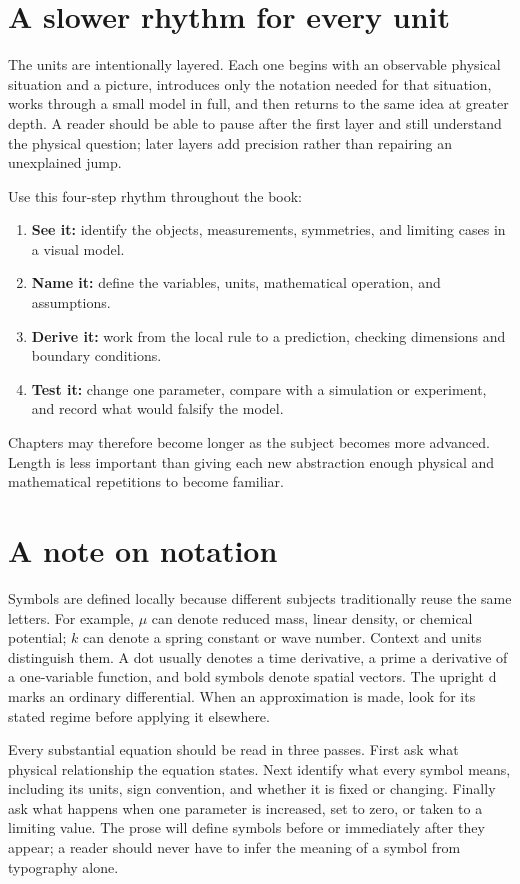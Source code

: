 \documentclass[11pt,oneside]{book}
\newcommand{\dd}{\mathrm{d}}
\theoremstyle{reviewstyle}
\begin{document}
\section*{A slower rhythm for every unit}
The units are intentionally layered. Each one begins with an observable physical situation and a picture, introduces only the notation needed for that situation, works through a small model in full, and then returns to the same idea at greater depth. A reader should be able to pause after the first layer and still understand the physical question; later layers add precision rather than repairing an unexplained jump.

Use this four-step rhythm throughout the book:
\begin{enumerate}
\item \textbf{See it:} identify the objects, measurements, symmetries, and limiting cases in a visual model.
\item \textbf{Name it:} define the variables, units, mathematical operation, and assumptions.
\item \textbf{Derive it:} work from the local rule to a prediction, checking dimensions and boundary conditions.
\item \textbf{Test it:} change one parameter, compare with a simulation or experiment, and record what would falsify the model.
\end{enumerate}
Chapters may therefore become longer as the subject becomes more advanced. Length is less important than giving each new abstraction enough physical and mathematical repetitions to become familiar.

\section*{A note on notation}
Symbols are defined locally because different subjects traditionally reuse the same letters. For example, $\mu$ can denote reduced mass, linear density, or chemical potential; $k$ can denote a spring constant or wave number. Context and units distinguish them. A dot usually denotes a time derivative, a prime a derivative of a one-variable function, and bold symbols denote spatial vectors. The upright $\dd$ marks an ordinary differential. When an approximation is made, look for its stated regime before applying it elsewhere.

Every substantial equation should be read in three passes. First ask what physical relationship the equation states. Next identify what every symbol means, including its units, sign convention, and whether it is fixed or changing. Finally ask what happens when one parameter is increased, set to zero, or taken to a limiting value. The prose will define symbols before or immediately after they appear; a reader should never have to infer the meaning of a symbol from typography alone.
\end{document}
